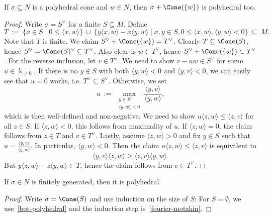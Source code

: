\begin{proposition}
  \label{fourier-motzkin}
  If \( \sigma \subseteq N \) is a polyhedral cone and \( w \in N \),
  then \( \sigma + \Cone(\{w\}) \) is polyhedral too.
\end{proposition}
\begin{proof}
  Write \( \sigma = S^{\vee} \) for a finite \( S \subseteq M \).
  Define
  \[
      T\ :=\ \{x \in S \mid 0 \leq \langle x, w \rangle \}\ \cup\ 
      \{y \langle x, w \rangle - x \langle y, w \rangle \mid x, y \in
      S, 0 \leq \langle x, w \rangle, \langle y, w \rangle < 0 \}\ 
      \subseteq\ M.
  \]
  Note that \( T \) is finite. We claim \( S^{\vee} + \Cone(\{w\}) =
  T^{\vee} \). Clearly \( T \subseteq \Cone(S) \), hence \( S^{\vee} =
  \Cone(S)^{\vee} \subseteq T^{\vee} \). Also clear is \( w \in
  T^{\vee} \), hence \( S^{\vee} + \Cone(\{w\}) \subset T^{\vee} \).
  For the reverse inclusion, let \( v \in T^\vee \). We need to show
  \( v - uw \in S^\vee \) for some \( u \in \Bbbk_{\geq 0} \). If
  there is no \( y \in S \) with both \( \langle y, w \rangle < 0 \)
  and \( \langle y, v \rangle < 0 \), we can easily see that \( u = 0
  \) works, i.e. \( T^{\vee} \subseteq S^{\vee} \). Otherwise, we
  set
  \[
      u\ :=\ \max_{\substack{y \in S \\ \langle y, w \rangle < 0}}
      \frac{\langle y, v \rangle}{\langle y, w \rangle},
  \]
  which is then well-defined and non-negative. We need to show
  \( u \langle z, w \rangle \leq \langle z, v \rangle \) for all \( z
  \in S \). If \( \langle z, w \rangle < 0 \), this follows from
  maximality of \( u \). If \( \langle z, w \rangle = 0 \), the claim
  follows from \( z \in T \) and \( v \in T^{\vee} \). Lastly, assume
  \( \langle z, w \rangle > 0 \) and fix \( y \in S \) such that \( u
  = \frac{\langle y, v \rangle}{\langle y, w \rangle} \). In
  particular, \( \langle y, w \rangle < 0 \). Then the claim \( u
  \langle z, w \rangle \leq \langle z, v \rangle \) is equivalent to
  \[
      \langle y, v \rangle \langle z, w \rangle \geq
      \langle z, v \rangle \langle y, w \rangle.
  \]
  But \( y \langle z, w \rangle - z \langle y, w \rangle \in T \),
  hence the claim follows from \( v \in T^{\vee} \).
\end{proof}

\begin{proposition}
  \label{polyhedral-of-fg}
  If \( \sigma \in N \) is finitely generated, then it is polyhedral.
\end{proposition}
\begin{proof}
  Write \( \sigma = \Cone(S) \) and use induction on the size of \( S
  \): For \( S = \emptyset \), we use~\ref{bot-polyhedral}
  and the induction step is~\ref{fourier-motzkin}.
\end{proof}

